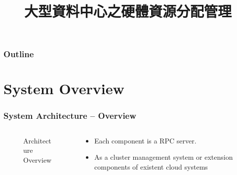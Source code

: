 \documentclass{beamer}
\title{大型資料中心之硬體資源分配管理}
\begin{document}
\begin{frame}
  \titlepage
  \label{title-page}
\end{frame}
\begin{frame}
  \frametitle{Outline}
  \tableofcontents[
    currentsubsection,
    sectionstyle=show/show,
    subsectionstyle=show/shaded,
  ]
\end{frame}


\section{System Overview}
\begin{frame}
  \frametitle{System Architecture -- Overview}
  \begin{columns}
    \begin{column}{.5\textwidth}
      \begin{figure}
        \resizebox{\linewidth}{!}{
          
        }
        \caption{Architecture Overview}
        \label{fig:archi-overview}
      \end{figure}
    \end{column}
    \begin{column}{.5\textwidth}
      \begin{itemize}
        \item Each component is a RPC server.
        \item As a cluster management system or extension
          components of existent cloud systems
      \end{itemize}
    \end{column}
  \end{columns}
\end{frame}


\end{document}
